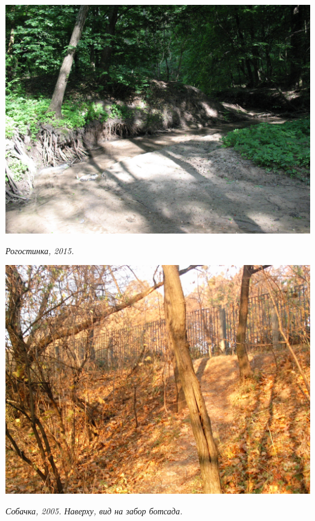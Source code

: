 \begin{center}
\includegraphics[width=\linewidth]{rpix/IMG_4332.JPG}

\textit{Рогостинка, 2015.}
\end{center}


\begin{center}
\includegraphics[width=0.95\linewidth]{rpix/imag0041.jpg}

\textit{Собачка, 2005. Наверху, вид на забор ботсада.}
\end{center}


